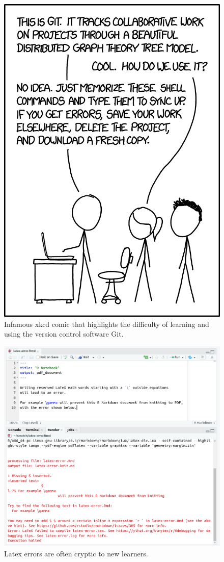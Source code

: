 \documentclass[
  12 pt,
]{paper}
\begin{document}
\begin{figure}

{\centering \includegraphics[width=0.3\linewidth]{img/git_2x} 

}

\caption{Infamous xkcd comic that highlights the difficulty of learning and using the version control software Git.}\label{fig:git-is-hard-xkcd}
\end{figure}

\begin{figure}

{\centering \includegraphics[width=1\linewidth]{img/r-latex-error} 

}

\caption{Latex errors are often cryptic to new learners.}\label{fig:latex-errors}
\end{figure}
\end{document}
